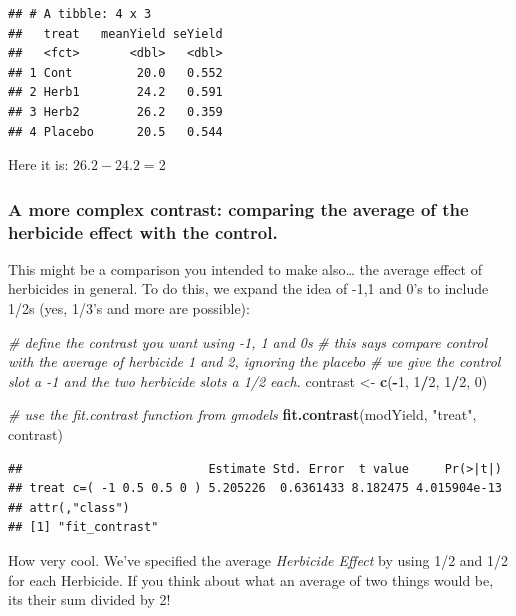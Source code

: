 \documentclass[
]{book}
\newenvironment{Shaded}{\begin{snugshade}}{\end{snugshade}}
\newcommand{\CommentTok}[1]{\textcolor[rgb]{0.56,0.35,0.01}{\textit{#1}}}
\newcommand{\DecValTok}[1]{\textcolor[rgb]{0.00,0.00,0.81}{#1}}
\newcommand{\FunctionTok}[1]{\textcolor[rgb]{0.13,0.29,0.53}{\textbf{#1}}}
\newcommand{\NormalTok}[1]{#1}
\newcommand{\OtherTok}[1]{\textcolor[rgb]{0.56,0.35,0.01}{#1}}
\newcommand{\SpecialCharTok}[1]{\textcolor[rgb]{0.81,0.36,0.00}{\textbf{#1}}}
\newcommand{\StringTok}[1]{\textcolor[rgb]{0.31,0.60,0.02}{#1}}
\begin{document}
\begin{verbatim}
## # A tibble: 4 x 3
##   treat   meanYield seYield
##   <fct>       <dbl>   <dbl>
## 1 Cont         20.0   0.552
## 2 Herb1        24.2   0.591
## 3 Herb2        26.2   0.359
## 4 Placebo      20.5   0.544
\end{verbatim}

Here it is: \(26.2 - 24.2 = 2\)

\hypertarget{a-more-complex-contrast-comparing-the-average-of-the-herbicide-effect-with-the-control.}{%
\subsubsection{A more complex contrast: comparing the average of the herbicide effect with the control.}\label{a-more-complex-contrast-comparing-the-average-of-the-herbicide-effect-with-the-control.}}

This might be a comparison you intended to make also\ldots{} the average effect of herbicides in general. To do this, we expand the idea of -1,1 and 0's to include 1/2s (yes, 1/3's and more are possible):

\begin{Shaded}
\begin{Highlighting}[]
\CommentTok{\# define the contrast you want using {-}1, 1 and 0\textquotesingle{}s}
\CommentTok{\# this says compare control with the average of herbicide 1 and 2, ignoring the placebo}
\CommentTok{\# we give the control slot a {-}1 and the two herbicide slots a 1/2 each.}
\NormalTok{contrast }\OtherTok{\textless{}{-}} \FunctionTok{c}\NormalTok{(}\SpecialCharTok{{-}}\DecValTok{1}\NormalTok{, }\DecValTok{1}\SpecialCharTok{/}\DecValTok{2}\NormalTok{, }\DecValTok{1}\SpecialCharTok{/}\DecValTok{2}\NormalTok{, }\DecValTok{0}\NormalTok{)}

\CommentTok{\# use the fit.contrast function from gmodels}
\FunctionTok{fit.contrast}\NormalTok{(modYield, }\StringTok{"treat"}\NormalTok{, contrast)}
\end{Highlighting}
\end{Shaded}

\begin{verbatim}
##                          Estimate Std. Error  t value     Pr(>|t|)
## treat c=( -1 0.5 0.5 0 ) 5.205226  0.6361433 8.182475 4.015904e-13
## attr(,"class")
## [1] "fit_contrast"
\end{verbatim}

How very cool. We've specified the average \emph{Herbicide Effect} by using 1/2 and 1/2 for each Herbicide. If you think about what an average of two things would be, its their sum divided by 2!
\end{document}
